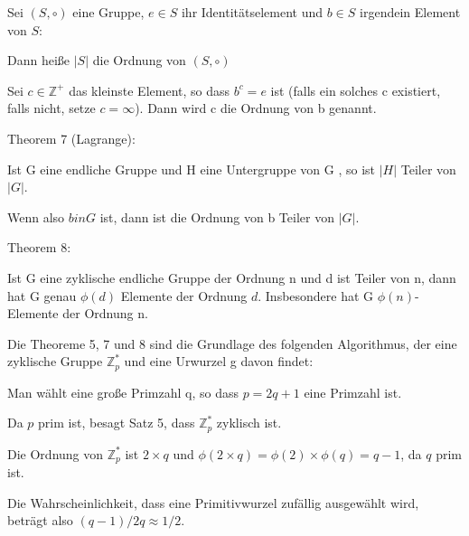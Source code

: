 \documentclass[a4paper]{article}
\begin{document}
\begin{multicols}{3}
\begin{itemize*}
            \begin{itemize*}
                  \item Sei $(S,\circ)$ eine Gruppe, $e\in S$ ihr Identitätselement und $b\in S$ irgendein Element von $S$:
                  \begin{itemize*} \item Dann heiße $| S|$ die Ordnung von $(S,\circ)$ \item Sei $c\in\mathbb{Z}^+$ das kleinste Element, so dass $b^c=e$ ist (falls ein solches c existiert, falls nicht, setze $c=\infty$). Dann wird c die Ordnung von b genannt. \end{itemize*}
            \end{itemize*}
            \item Theorem 7 (Lagrange):
            \begin{itemize*}
                  \item Ist G eine endliche Gruppe und H eine Untergruppe von G , so ist $| H|$ Teiler von $| G|$.
                  \item Wenn also $b in G$ ist, dann ist die Ordnung von b Teiler von $| G|$.
            \end{itemize*}
            \item Theorem 8:
            \begin{itemize*}
                  \item Ist G eine zyklische endliche Gruppe der Ordnung n und d ist Teiler von n, dann hat G genau $\phi(d)$ Elemente der Ordnung $d$. Insbesondere hat G $\phi(n)$-Elemente der Ordnung n.
            \end{itemize*}
            \item Die Theoreme 5, 7 und 8 sind die Grundlage des folgenden Algorithmus,
            der eine zyklische Gruppe $\mathbb{Z}^*_p$ und
            eine Urwurzel g davon findet:
            \begin{itemize*}
                  \item Man wählt eine große Primzahl q, so dass $p=2q+1$ eine Primzahl ist.
                  \begin{itemize*}
                        \item Da $p$ prim ist, besagt Satz 5, dass $\mathbb{Z}^*_p$ zyklisch ist.
                        \item Die Ordnung von $\mathbb{Z}^*_p$ ist $2\times q$ und $\phi(2\times q)=\phi(2)\times \phi(q)=q-1$, da $q$ prim ist.
                        \item Die Wahrscheinlichkeit, dass eine Primitivwurzel zufällig ausgewählt wird, beträgt also $(q-1)/2q \approx 1/2$.

\end{itemize*}
\end{itemize*}
\end{itemize*}
\end{multicols}
\end{document}
